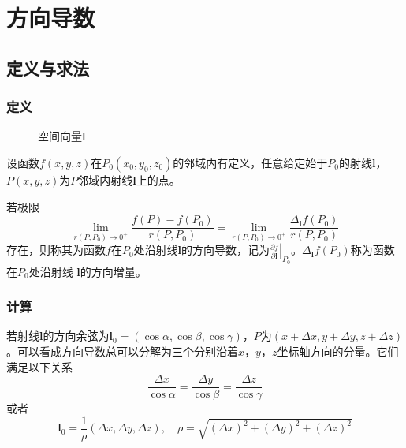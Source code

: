 \section{方向导数}
\subsection{定义与求法}
\begin{frame}
    \frametitle{定义}

    \begin{wrapfigure}{r}{.45\linewidth}
        \centering
        \def\svgwidth{.7\columnwidth}
        \vspace{-20pt}
        \scalebox{.4}{}
        \vspace{-5pt}
        \caption{空间向量$\boldsymbol{l}$\label{fig:dirder}}
        \vspace{-40pt}
    \end{wrapfigure}

    \vfill
    设函数$f(x,y,z)$在$P_0(x_0,y_0,z_0)$的邻域内有定义，任意给定始于$P_0$的射线$\boldsymbol{l}$，$P(x,y,z)$为$P$邻域内射线$\boldsymbol{l}$上的点。\pause
    \vspace{20pt}

    若极限
    \begin{equation}
        \lim_{r(P,P_0)\to 0^{+}}\frac{f(P)-f(P_0)}{r(P,P_0)} = \lim_{r(P,P_0)\to 0^{+}}\frac{\Delta_{\boldsymbol{l}}f(P_0)}{r(P,P_0)}\label{eq:dirder_def}
    \end{equation}
    存在，则称其为函数$f$在$P_0$处沿射线$\boldsymbol{l}$的\alert{方向导数}，记为$\displaystyle\left.\frac{\partial f}{\partial \boldsymbol{l}}\right|_{P_0}$。$\Delta_{\boldsymbol{l}}f(P_0)$称为函数在$P_0$处沿射线 $\boldsymbol{l}$的\alert{方向增量}。

\end{frame}

\begin{frame}
    \frametitle{计算}

    若射线$\boldsymbol{l}$的方向余弦为$\boldsymbol{l}_0=(\cos\alpha,\cos\beta,\cos\gamma)$，$P$为$(x+\Delta x,y+\Delta y,z+\Delta z)$。可以看成方向导数总可以分解为三个分别沿着$x$，$y$，$z$坐标轴方向的分量。它们满足以下关系\pause
    \begin{equation}
        \frac{\Delta x}{\cos\alpha}=\frac{\Delta y}{\cos\beta}=\frac{\Delta z}{\cos\gamma}\label{eq:dirder_subdir}
    \end{equation}\pause
    或者
    \begin{equation}
        \boldsymbol{l}_0=\frac{1}{\rho}(\Delta x,\Delta y,\Delta z),\quad \rho=\sqrt{(\Delta x)^2+(\Delta y)^2+(\Delta z)^2}\label{eq:dirder_subdir2}
    \end{equation}

\end{frame}


